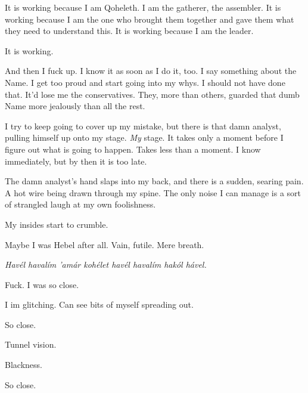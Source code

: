 It is working because I am Qoheleth. I am the gatherer, the assembler. It is working because I am the one who brought them together and gave them what they need to understand this. It is working because I am the leader.

It is working.

And then I fuck up. I know it as soon as I do it, too. I say something about the Name. I get too proud and start going into my whys. I should not have done that. It'd lose me the conservatives. They, more than others, guarded that dumb Name more jealously than all the rest.

I try to keep going to cover up my mistake, but there is that damn analyst, pulling himself up onto my stage. \emph{My} stage. It takes only a moment before I figure out what is going to happen. Takes less than a moment. I know immediately, but by then it is too late.

The damn analyst's hand slaps into my back, and there is a sudden, searing pain. A hot wire being drawn through my spine. The only noise I can manage is a sort of strangled laugh at my own foolishness.

My insides start to crumble.

Maybe I was Hebel after all. Vain, futile. Mere breath.

\emph{Havél havalím 'amár kohélet havél havalím hakól hável.}

Fuck. I was so close.

I im glitching. Can see bits of myself spreading out.

So close.

Tunnel vision.

Blackness.

So close.
